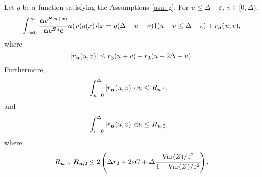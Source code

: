 \begin{cor}\label{cor: cond bnd 2 U}
	Let \(g\) be a function satisfying the Assumptions \ref{asu: g}. For \(u\leq \Delta-\varepsilon \), \(v\in[ 0,\Delta)\), 
	\[\int_{x=0}^\infty \cfrac{\boldsymbol \alpha  e^{\boldsymbol{S} (u+x)} }{\boldsymbol \alpha  e^{\boldsymbol{S} u} \boldsymbol e} {\boldsymbol u}(v)g(x)\, \mathrm{d} x = g(\Delta-u-v) 1(u+v\leq\Delta-\varepsilon) + r_{{\boldsymbol u}} (u,v),\]
	where 
	\[\left|r_{\boldsymbol u} (u,v)\right|\leq r_3 (u+v) + r_3 (u+2\Delta - v).\]
	Furthermore,  
	\begin{align*}
		&\int_{u=0}^{\Delta}| r_{{\boldsymbol u}}(u,v)|\, \mathrm{d} u
		\leq R_{{{\boldsymbol u}},1},
	\end{align*}
	and
	\begin{align*}
		&\int_{v=0}^{\Delta}| r_{{\boldsymbol u}}(u,v)|\, \mathrm{d} u
		\leq R_{{{\boldsymbol u}},2},
	\end{align*}
	where 
	\[R_{{{\boldsymbol u}},1},\, R_{{{\boldsymbol u}},2} \leq 2\left(\Delta r_2 + 2\varepsilon G + \Delta\cfrac{\mathrm{Var}(Z)/\varepsilon^2}{1-\mathrm{Var}(Z)/\varepsilon^2}\right).\]
\end{cor}

